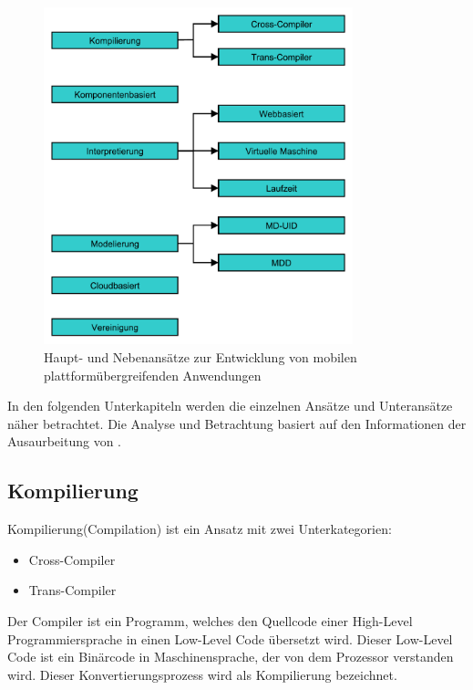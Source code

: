 \begin{figure}[htbp]
	\centering
	\includegraphics[width=0.8\textwidth]{Bilder/Cross_Plattform_Ansaetze}
	\caption{Haupt- und Nebenansätze zur Entwicklung von mobilen plattformübergreifenden Anwendungen}\label{graph_cross_plattform_approaches}
\end{figure}

In den folgenden Unterkapiteln werden die einzelnen Ansätze und Unteransätze näher betrachtet. Die Analyse und Betrachtung basiert auf den Informationen der Ausaurbeitung von \citep{cross_plattform_approaches}.

\subsection{Kompilierung}
Kompilierung(Compilation) ist ein Ansatz mit zwei Unterkategorien:

\begin{itemize}
	\item Cross-Compiler
	\item Trans-Compiler
\end{itemize}

Der Compiler ist ein Programm, welches den Quellcode einer High-Level Programmiersprache in einen Low-Level Code übersetzt wird. Dieser Low-Level Code ist ein Binärcode in Maschinensprache, der von dem Prozessor verstanden wird. Dieser Konvertierungsprozess wird als Kompilierung bezeichnet.

